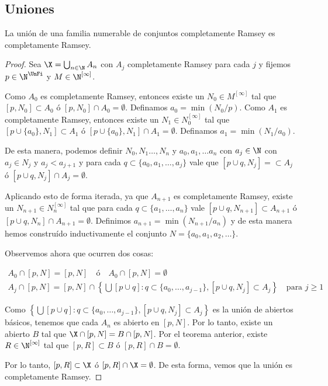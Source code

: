 \subsection{Uniones}

\begin{teo}
    La unión de una familia numerable de conjuntos completamente Ramsey es completamente Ramsey.
\end{teo}

\begin{proof}
    Sea $\X = \bigcup_{n \in \N} A_n$ con $A_j$ completamente Ramsey para cada $j$ y fijemos $p \in \N^{\UnFi}$ y $M \in \N^{[\infty]}$.
    
    Como $A_0$ es completamente Ramsey, entonces existe un $N_0 \in M^{[\infty]}$ tal que $[p, N_0] \subset A_0$ ó $[p, N_0] \cap A_0 = \emptyset$. Definamos $a_0 = \min(N_0/p)$. Como $A_1$ es completamente Ramsey, entonces existe un $N_1 \in N_0^{[\infty]}$ tal que $[p \cup \{a_0\}, N_1] \subset A_1$ ó $[p \cup \{a_0\}, N_1] \cap A_1 = \emptyset$. Definamos $a_1 = \min(N_1/a_0)$.
    
    De esta manera, podemos definir $N_0, N_1 \dots, N_n$ y $a_0, a_1, \dots a_n$ con $a_j \in \N$ con $a_j \in N_j$ y $a_j < a_{j+1}$ y para cada $q \subset \{a_0, a_1, \dots, a_j\}$ vale que $[p \cup q, N_j] = \subset A_j$ ó $[p \cup q, N_j] \cap A_j = \emptyset$.
    
    Aplicando esto de forma iterada, ya que $A_{n+1}$ es completamente Ramsey, existe un $N_{n+1} \in N_n^{[\infty]}$ tal que para cada $q \subset \{a_1, \dots, a_n\}$ vale $[p \cup q, N_{n+1}] \subset A_{n+1}$ ó $[p \cup q, N_n] \cap A_{n+1} = \emptyset$. Definimos $a_{n+1} = \min(N_{n+1}/a_n)$ y de esta manera hemos construído inductivamente el conjunto $N = \{a_0, a_1, a_2, \dots\}$.
    
    Observemos ahora que ocurren dos cosas:
    
    \begin{gather*}
        A_0 \cap [p,N] = [p,N] \quad \text{ó} \quad A_0 \cap [p,N] = \emptyset \\
        A_j \cap [p, N] = [p, N] \cap \left\{ \bigcup [p \cup q] : q \subset \{a_0, \dots, a_{j-1}\}, [p \cup q, N_j] \subset A_j \right\} \quad \text{para $j \geq 1$}
    \end{gather*}
    
    Como $\left\{ \bigcup [p \cup q] : q \subset \{a_0, \dots, a_{j-1}\}, [p \cup q, N_j] \subset A_j \right\}$ es la unión de abiertos básicos, tenemos que cada $A_n$ es abierto en $[p, N]$. Por lo tanto, existe un abierto $B$ tal que $\X \cap [p, N] = B \cap [p, N]$. Por el teorema anterior, existe $R \in \N^{[\infty]}$ tal que $[p, R] \subset B$ ó $[p, R] \cap B = \emptyset$.
    
    Por lo tanto, $[p, R] \subset \X$ ó $[p, R] \cap \X = \emptyset$. De esta forma, vemos que la unión es completamente Ramsey.
\end{proof}

